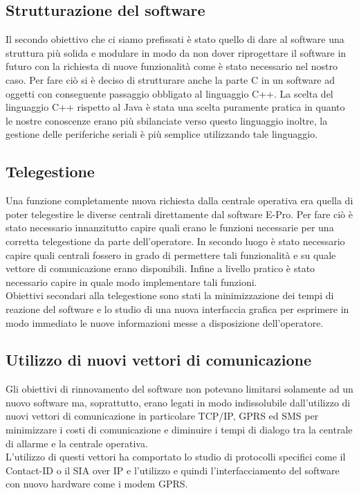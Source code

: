 \subsection{Strutturazione del software}
Il secondo obiettivo che ci siamo prefissati è stato quello di dare al software una struttura più solida e modulare in modo da non dover riprogettare il software in futuro con la richiesta di nuove funzionalità come è stato necessario nel nostro caso. Per fare ciò si è deciso di strutturare anche la parte C in un software ad oggetti con conseguente passaggio obbligato al linguaggio C++. La scelta del linguaggio C++ rispetto al Java è stata una scelta puramente pratica in quanto le nostre conoscenze erano più sbilanciate verso questo linguaggio inoltre, la gestione delle periferiche seriali è più semplice utilizzando tale linguaggio.
\subsection{Telegestione}
Una funzione completamente nuova richiesta dalla centrale operativa era quella di poter telegestire le diverse centrali direttamente dal software E-Pro. Per fare ciò è stato necessario innanzitutto capire quali erano le funzioni necessarie per una corretta telegestione da parte dell'operatore. In secondo luogo è stato necessario capire quali centrali fossero in grado di permettere tali funzionalità e su quale vettore di comunicazione erano disponibili. Infine a livello pratico è stato necessario capire in quale modo implementare tali funzioni.\\
Obiettivi secondari alla telegestione sono stati la minimizzazione dei tempi di reazione del software e lo studio di una nuova interfaccia grafica per esprimere in modo immediato le nuove informazioni messe a disposizione dell'operatore.
\subsection{Utilizzo di nuovi vettori di comunicazione}
Gli obiettivi di rinnovamento del software non potevano limitarsi solamente ad un nuovo software ma, soprattutto, erano legati in modo indissolubile dall'utilizzo di nuovi vettori di comunicazione in particolare TCP/IP, GPRS ed SMS per minimizzare i costi di comunicazione e diminuire i tempi di dialogo tra la centrale di allarme e la centrale operativa.\\
L'utilizzo di questi vettori ha comportato lo studio di protocolli specifici come il Contact-ID o il SIA over IP e l'utilizzo e quindi l'interfacciamento del software con nuovo hardware come i modem GPRS.
